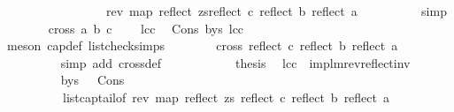 \begin{isabellebody}
\ \ \ \ \ \ \ \ \ \ \ \ \ \ \ \ {\isacharequal}{\kern0pt}\ {\isacharparenleft}{\kern0pt}rev\ {\isacharparenleft}{\kern0pt}map\ reflect\ zs{\isacharparenright}{\kern0pt}{\isacharparenright}{\kern0pt}{\isacharat}{\kern0pt}{\isacharparenleft}{\kern0pt}{\isacharbrackleft}{\kern0pt}reflect\ c{\isacharcomma}{\kern0pt}\ reflect\ b{\isacharcomma}{\kern0pt}\ reflect\ a{\isacharbrackright}{\kern0pt}{\isacharparenright}{\kern0pt}{\isachardoublequoteclose}\isanewline
\ \ \ \ \ \ \ \ \isamarkupfalse%
\ simp\isanewline
\ \ \ \ \ \ \isamarkupfalse%
\ {\isachardoublequoteopen}cross{}\ a\ b\ c\ {\isacharless}{\kern0pt}\ {}{\isachardoublequoteclose}\ \isamarkupfalse%
\ lcc\ \isamarkupfalse%
\ Cons\ b{\isacharunderscore}{\kern0pt}ys\ lcc\ \isanewline
\ \ \ \ \ \ \ \ \isamarkupfalse%
\ {\isacharparenleft}{\kern0pt}meson\ cap{}{\isacharunderscore}{\kern0pt}def\ list{\isacharunderscore}{\kern0pt}check{\isachardot}{\kern0pt}simps{\isacharparenleft}{\kern0pt}{}{\isacharparenright}{\kern0pt}{\isacharparenright}{\kern0pt}\isanewline
\ \ \ \ \ \ \isamarkupfalse%
\ {\isachardoublequoteopen}cross{}\ {\isacharparenleft}{\kern0pt}reflect\ c{\isacharparenright}{\kern0pt}\ {\isacharparenleft}{\kern0pt}reflect\ b{\isacharparenright}{\kern0pt}\ {\isacharparenleft}{\kern0pt}reflect\ a{\isacharparenright}{\kern0pt}\ {\isachargreater}{\kern0pt}\ {}{\isachardoublequoteclose}\ \isanewline
\ \ \ \ \ \ \ \ \isamarkupfalse%
\ {\isacharparenleft}{\kern0pt}simp\ add{\isacharcolon}{\kern0pt}\ cross{}{\isacharunderscore}{\kern0pt}def{\isacharparenright}{\kern0pt}\ \ \isanewline
\ \ \ \ \ \ \isamarkupfalse%
\ \isamarkupfalse%
\ {\isacharquery}{\kern0pt}thesis\ \isamarkupfalse%
\ lcc\ \ implm{\isacharunderscore}{\kern0pt}rev{\isacharunderscore}{\kern0pt}reflect{\isacharunderscore}{\kern0pt}inv\ \isanewline
\ \ \ \ \ \ \ \ \isamarkupfalse%
\ b{\isacharunderscore}{\kern0pt}ys\ \ \ Cons\ \isamarkupfalse%
\ \isanewline
\ \ \ \ \ \ \ \ \ \ list{\isacharunderscore}{\kern0pt}cap{\isacharunderscore}{\kern0pt}tail{\isacharbrackleft}{\kern0pt}of\ {\isachardoublequoteopen}{\isacharparenleft}{\kern0pt}rev\ {\isacharparenleft}{\kern0pt}map\ reflect\ zs{\isacharparenright}{\kern0pt}{\isacharparenright}{\kern0pt}{\isachardoublequoteclose}\ {\isachardoublequoteopen}reflect\ c{\isachardoublequoteclose}\ {\isachardoublequoteopen}reflect\ b{\isachardoublequoteclose}\ {\isachardoublequoteopen}reflect\ a{\isachardoublequoteclose}{\isacharbrackright}{\kern0pt}\isanewline

\end{isabellebody}

